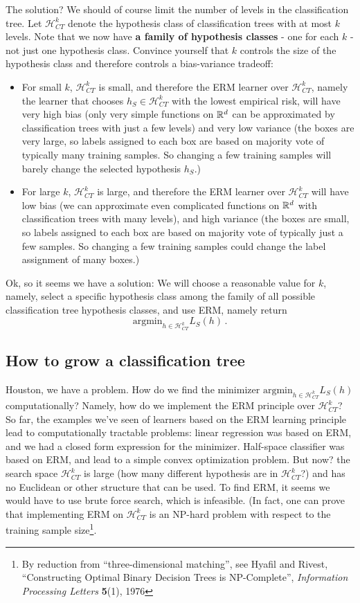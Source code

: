 \documentclass[11pt]{article}
\newcommand{\Hc}{\mathcal{H}}
\begin{document}
 The solution? We should of course limit the number of levels in the
 classification tree. Let $\Hc_{CT}^k$ denote the hypothesis class of
 classification trees with at most $k$ levels. Note that we now have {\bf a
 family of hypothesis classes} - one for each $k$ - not just one hypothesis
 class. Convince yourself that $k$ controls the size of the hypothesis class and
 therefore controls a bias-variance tradeoff:
 \begin{itemize}
   \item
 For small $k$,  $\Hc_{CT}^k$ is
 small, and therefore the ERM learner over  $\Hc_{CT}^k$, namely the learner
 that chooses $h_S\in\Hc_{CT}^k$ with the lowest empirical risk,  will have very high bias
 (only very simple functions on $\mathbb{R}^d$ can be approximated by classification
 trees with just a few levels) and very low variance (the boxes are very large,
   so labels assigned to each box are based on majority vote of typically many
   training samples. So changing a few training samples will barely change the
 selected hypothesis $h_S$.)
 \item For large $k$,  $\Hc_{CT}^k$  is large, and therefore the ERM learner
   over  $\Hc_{CT}^k$ will have low bias (we can approximate even complicated
   functions on $\mathbb{R}^d$ with classification trees with many levels), and high
   variance (the boxes are small, so labels assigned to each box are based on
     majority vote of typically just a few samples. So changing a few training
   samples could change the label assignment of many boxes.)
\end{itemize}

Ok, so it seems we have a solution: We will choose a reasonable value for $k$,
namely, select a specific hypothesis class among the family of all possible
classification tree hypothesis classes, and use ERM, namely return 
\[
  \text{argmin}_{h\in\Hc^k_{CT}} L_S(h)\,.
 \]


 \subsection{How to grow a classification tree}

 Houston, we have a problem. How do we find the minimizer
 $\text{argmin}_{h\in\Hc^k_{CT}} L_S(h)$ computationally? Namely, how do we
 implement the ERM principle over $\Hc^k_{CT}$? 
 So far, the examples we've seen of learners based
 on the ERM learning principle lead to computationally tractable problems:
 linear regression was based on ERM, and we had a closed form expression for the
 minimizer. Half-space classifier was based on ERM, and lead to a simple
 convex optimization problem. But now? the search space $\Hc^k_{CT}$ is large
 (how many different hypothesis are in $\Hc^k_{CT}$?) and has no
 Euclidean or other structure  that can be used. To find ERM, it seems we would
 have to use brute force search, which is infeasible. (In fact, one can prove
   that implementing ERM on  $\Hc^k_{CT}$ is an NP-hard problem with respect to
   the training sample size\footnote{By
     reduction from ``three-dimensional matching'', see
     Hyafil and Rivest, ``Constructing Optimal Binary Decision Trees is
   NP-Complete'', {\em Information  Processing Letters} {\bf 5}(1), 1976}. 
\end{document}
